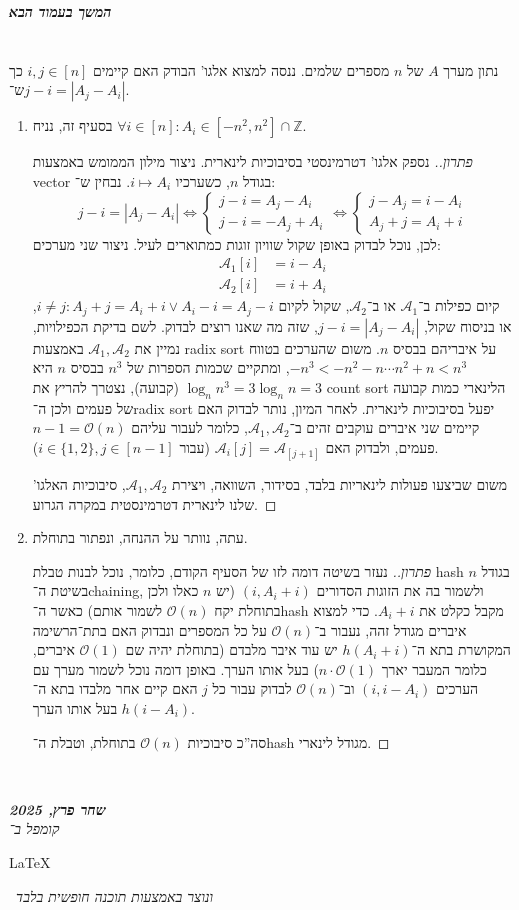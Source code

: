 \documentclass[]{article}
\newcommand\en[1] {\begin{otherlanguage}{english}#1\end{otherlanguage}}
\newcommand\npage {\vfil {\hfil \textbf{\textit{המשך בעמוד הבא}}} \hfil \vfil \pagebreak}
\newcommand\ndoc  {\dotfill \\ \vfil {\begin{center}
			{\textbf{\textit{שחר פרץ, 2025}} \\
				\scriptsize \textit{קומפל ב־}\en{\LaTeX}\,\textit{ ונוצר באמצעות תוכנה חופשית בלבד}}
	\end{center}} \vfil	}
\newcommand\Z     {\mathbb{Z}}
\newcommand\ac    {\mathcal{A}}
\newcommand\oc    {\mathcal{O}}
\newcommand\co        {\colon}
\newcommand\sof[1]    {\left | #1 \right |}
\newcommand\dequad    {\!\!\!\!\!\!}
\theoremstyle{definition}
\begin{document}
	\npage
	\section{}
	נתון מערך $A$ של $n$ מספרים שלמים. ננסה למצוא אלגו' הבודק האם קיימים $i, j \in [n]$ כך ש־$j - i = \sof{A_j - A_i}$. 
	\begin{enumerate}
		\item בסעיף זה, נניח $\forall i \in [n] \co A_i \in [-n^2, n^2] \cap \Z$. \begin{proof}[פתרון.]
			נספק אלגו' דטרמינסטי בסיבוכיות לינארית. ניצור מילון הממומש באמצעות vector בגודל $n$, כשערכיו $i \mapsto A_i$. 
			נבחין ש־: 
			\[ j -i = \sof{A_j - A_i} \iff \begin{cases}
				j - i = A_j - A_i \\
				j - i = -A_j + A_i
			\end{cases}\dequad\iff \begin{cases}
				j - A_j = i - A_i \\
				A_j + j = A_i + i
			\end{cases} \]
			לכן, נוכל לבדוק באופן שקול שוויון זוגות כמתוארים לעיל. ניצור שני מערכים: 
			\begin{align*}
				\ac_1[i] &= i - A_i \\
				\ac_2[i] &= i + A_i
			\end{align*}
			קיום כפילות ב־$\ac_1$ או ב־$\ac_2$, שקול לקיום $i \neq j \co A_j + j = A_i + i \lor A_i - i = A_j - i$, או בניסוח שקול, $j - i = \sof{A_j - A_i}$, שזה מה שאנו רוצים לבדוק. לשם בדיקת הכפילויות, נמיין את $\ac_1, \ac_2$ באמצעות radix sort על איבריהם בבסיס $n$. משום שהערכים בטווח $-n^3 < -n^2 -n \cdots n^2 + n < n^3$, ומתקיים שכמות הספרות של $n^3$ בבסיס $n$ היא $\log_n n^3 = 3\log_nn = 3$ (קבועה), נצטרך להריץ את count sort הלינארי כמות קבועה של פעמים ולכן ה־radix sort יפעל בסיבוכיות לינארית. לאחר המיון, נותר לבדוק האם קיימים שני איברים עוקבים זהים ב־$\ac_1, \ac_2$, כלומר לעבור עליהם $n - 1 = \oc(n)$ פעמים, ולבדוק האם $\ac_i[j] = \ac_[j + 1]$ (עבור $i \in \{1, 2\}, j \in [n - 1]$).
			
			משום שביצעו פעולות לינאריות בלבד, בסידור, השוואה, ויצירת $\ac_1, \ac_2$, סיבוכיות האלגו' שלנו לינארית דטרמינסטית במקרה הגרוע. 
		\end{proof}
		\item עתה, נוותר על ההנחה, ונפתור בתוחלת. \begin{proof}[פתרון.]
			נעזר בשיטה דומה לזו של הסעיף הקודם, כלומר, נוכל לבנות טבלת hash בגודל $n$ בשיטת ה־chaining, ולשמור בה את הזוגות הסדורים $(i, A_i + i)$ (יש $n$ כאלו ולכן בתוחלת יקח $\oc(n)$ לשמור אותם) כאשר ה־hash מקבל כקלט את $A_i + i$. כדי למצוא איברים מגודל זהה, נעבור ב־$\oc(n)$ על כל המספרים ונבדוק האם בתת־הרשימה המקושרת בתא ה־$h(A_i + i)$ יש עוד איבר מלבדם (בתוחלת יהיה שם $\oc(1)$ איברים, כלומר המעבר יארך $n \cdot \oc(1)$) בעל אותו הערך. באופן דומה נוכל לשמור מערך עם הערכים $(i, i - A_i)$ וב־$\oc(n)$ לבדוק עבור כל $j$ האם קיים אחר מלבדו בתא ה־$h(i - A_i)$ בעל אותו הערך. 
			
			סה''כ סיבוכיות $\oc(n)$ בתוחלת, וטבלת ה־hash מגודל לינארי. 
		\end{proof}
	\end{enumerate}
	
	
	
	
	\ndoc
\end{document}
